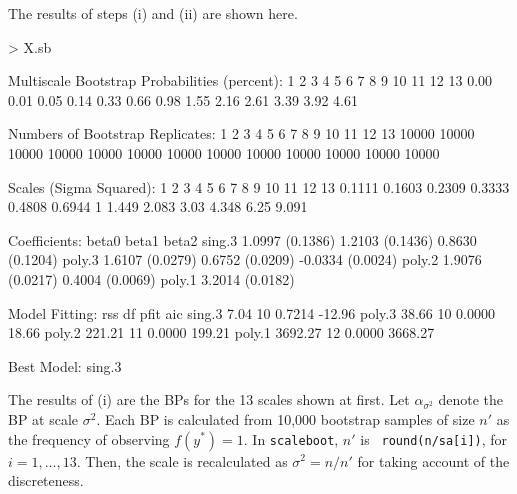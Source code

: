 \documentclass[a4paper]{amsart}
\begin{document}
The results of steps (i) and (ii) are shown here.
\begin{Schunk}
\begin{Sinput}
> X.sb
\end{Sinput}
\begin{Soutput}
Multiscale Bootstrap Probabilities (percent):
1    2    3    4    5    6    7    8    9    10   11   12   13   
0.00 0.01 0.05 0.14 0.33 0.66 0.98 1.55 2.16 2.61 3.39 3.92 4.61 

Numbers of Bootstrap Replicates:
1     2     3     4     5     6     7     8     9     10    11    12    13    
10000 10000 10000 10000 10000 10000 10000 10000 10000 10000 10000 10000 10000 

Scales (Sigma Squared):
1      2      3      4      5      6      7 8     9     10   11    12   13    
0.1111 0.1603 0.2309 0.3333 0.4808 0.6944 1 1.449 2.083 3.03 4.348 6.25 9.091 

Coefficients:
       beta0           beta1           beta2            
sing.3 1.0997 (0.1386) 1.2103 (0.1436)  0.8630 (0.1204) 
poly.3 1.6107 (0.0279) 0.6752 (0.0209) -0.0334 (0.0024) 
poly.2 1.9076 (0.0217) 0.4004 (0.0069)                  
poly.1 3.2014 (0.0182)                                  

Model Fitting:
       rss     df pfit   aic     
sing.3    7.04 10 0.7214  -12.96 
poly.3   38.66 10 0.0000   18.66 
poly.2  221.21 11 0.0000  199.21 
poly.1 3692.27 12 0.0000 3668.27 

Best Model:  sing.3 
\end{Soutput}
\end{Schunk}

The results of (i) are the BPs for the 13 scales shown at first. Let
$\alpha_{\sigma^2}$ denote the BP at scale $\sigma^2$. Each BP is
calculated from 10,000 bootstrap samples of size $n'$ as the frequency
of observing $f(y^*)=1$. In {\tt scaleboot}, $n'$ is {\tt
round(n/sa[i])}, for $i=1,\ldots,13$. Then, the scale is recalculated
as $\sigma^2=n/n'$ for taking account of the discreteness. 
\end{document}
